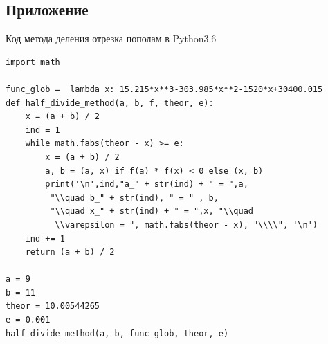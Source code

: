 \documentclass[14pt,a4paper]{scrartcl}
\begin{document}
\subsection*{Приложение}
Код метода деления отрезка пополам в Python3.6
\begin{verbatim}
import math

func_glob =  lambda x: 15.215*x**3-303.985*x**2-1520*x+30400.015
def half_divide_method(a, b, f, theor, e):
	x = (a + b) / 2
	ind = 1
	while math.fabs(theor - x) >= e:
		x = (a + b) / 2
		a, b = (a, x) if f(a) * f(x) < 0 else (x, b)
		print('\n',ind,"a_" + str(ind) + " = ",a,
		 "\\quad b_" + str(ind), " = " , b, 
		 "\\quad x_" + str(ind) + " = ",x, "\\quad
		  \\varepsilon = ", math.fabs(theor - x), "\\\\", '\n')
	ind += 1
	return (a + b) / 2

a = 9
b = 11
theor = 10.00544265
e = 0.001
half_divide_method(a, b, func_glob, theor, e)
\end{verbatim}
\end{document}
